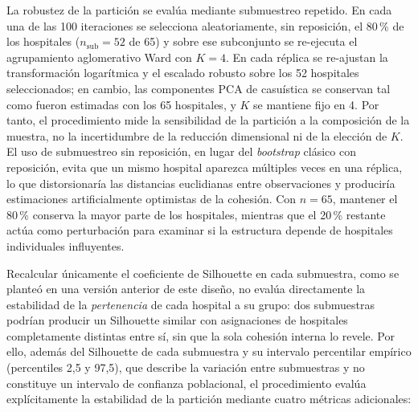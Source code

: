 La robustez de la partición se evalúa mediante submuestreo repetido. En cada
una de las 100 iteraciones se selecciona aleatoriamente, sin reposición, el
80\,\% de los hospitales ($n_{\text{sub}} = 52$ de 65) y sobre ese subconjunto
se re-ejecuta el agrupamiento aglomerativo Ward con $K=4$. En cada réplica se
re-ajustan la transformación logarítmica y el escalado robusto sobre los 52
hospitales seleccionados; en cambio, las componentes PCA de casuística se
conservan tal como fueron estimadas con los 65 hospitales, y $K$ se mantiene
fijo en 4. Por tanto, el procedimiento mide la sensibilidad de la partición
a la composición de la muestra, no la incertidumbre de la reducción
dimensional ni de la elección de $K$. El uso de submuestreo
sin reposición, en lugar del \textit{bootstrap} clásico con reposición, evita
que un mismo hospital aparezca múltiples veces en una réplica, lo que
distorsionaría las distancias euclidianas entre observaciones y produciría
estimaciones artificialmente optimistas de la cohesión. Con $n = 65$, mantener
el 80\,\% conserva la mayor parte de los hospitales, mientras que el
20\,\% restante actúa como perturbación para examinar si
la estructura depende de hospitales individuales influyentes.

Recalcular únicamente el coeficiente de Silhouette en cada submuestra, como se
planteó en una versión anterior de este diseño, no evalúa directamente la
estabilidad de la \emph{pertenencia} de cada hospital a su grupo: dos
submuestras podrían producir un Silhouette similar con asignaciones de
hospitales completamente distintas entre sí, sin que la sola cohesión interna
lo revele. Por ello, además del Silhouette de cada submuestra y su intervalo
percentilar empírico (percentiles 2{,}5 y 97{,}5), que describe la variación
entre submuestras y no constituye un intervalo de confianza poblacional, el procedimiento evalúa
explícitamente la estabilidad de la partición mediante cuatro métricas
adicionales:

